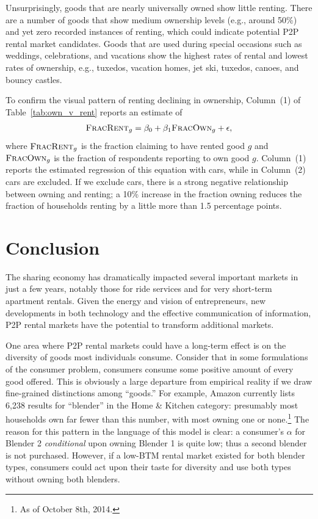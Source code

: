 \documentclass[12pt]{article}
\begin{document}
Unsurprisingly, goods that are nearly universally owned show little renting. 
There are a number of goods that show medium ownership levels (e.g., around 50\%) and yet zero recorded instances of renting, which could indicate potential P2P rental market candidates. 
Goods that are used during special occasions such as weddings, celebrations, and vacations show the highest rates of rental and lowest rates of ownership, e.g., tuxedos, vacation homes, jet ski, tuxedos, canoes, and bouncy castles. 



To confirm the visual pattern of renting declining in ownership, Column~(1) of Table~\ref{tab:own_v_rent} reports an estimate of 
\begin{align}
\textsc{FracRent}_g = \beta_0 + \beta_1 \textsc{FracOwn}_g + \epsilon,\end{align} 
where $\textsc{FracRent}_g$ is the fraction claiming to have rented good $g$ and $\textsc{FracOwn}_g$ is the fraction of respondents reporting to own good $g$.
Column~(1) reports the estimated regression of this equation with cars, while in Column~(2) cars are excluded.
If we exclude cars, there is a strong negative relationship between owning and renting;
a 10\% increase in the fraction owning reduces the fraction of households renting by a little more than 1.5 percentage points. 

\section{Conclusion} 
The sharing economy has dramatically impacted several important markets in just a few years, notably those for ride services and for very short-term apartment rentals.
Given the energy and vision of entrepreneurs, new developments in both technology and the effective communication of information, P2P rental markets have the potential to transform additional markets.

One area where P2P rental markets could have a long-term effect is on the diversity of goods most individuals consume. 
Consider that in some formulations of the consumer problem, consumers consume some positive amount of every good offered.
This is obviously a large departure from empirical reality if we draw fine-grained distinctions among ``goods.'' 
For example, Amazon currently lists 6,238 results for ``blender'' in the Home \& Kitchen category: 
presumably most households own far fewer than this number, with most owning one or none.\footnote{As of October 8th, 2014.}
The reason for this pattern in the language of this model is clear: 
a consumer's $\alpha$ for Blender 2 \emph{conditional} upon owning Blender 1 is quite low;
thus a second blender is not purchased.
However, if a low-BTM rental market existed for both blender types, consumers could act upon their taste for diversity and use both types without owning both blenders. 
\end{document}

